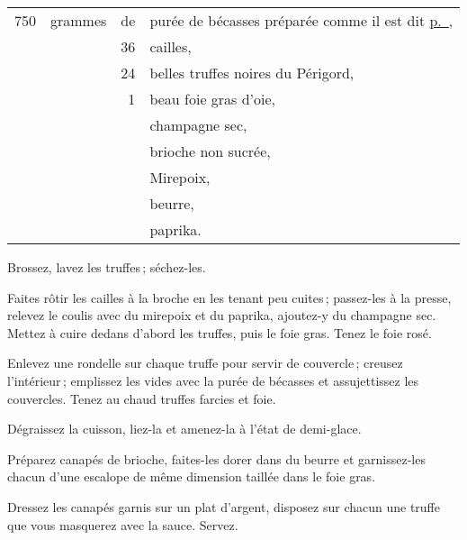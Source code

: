 \footnotesize
\begin{longtable}{rrrp{16em}}
  750 & grammes & de & purée de bécasses préparée comme il est dit \hyperlink{p0634}{p. \pageref{pg0634}}, \\
        &         & 36 & cailles,                                                                          \\
        &         & 24 & belles truffes noires du Périgord,                                                \\
        &         &  1 & beau foie gras d'oie,                                                             \\
        &         &    & champagne sec,                                                                    \\
        &         &    & brioche non sucrée,                                                               \\
        &         &    & Mirepoix,                                                                         \\
        &         &    & beurre,                                                                           \\
        &         &    & paprika.                                                                          \\
\end{longtable}
\normalsize

Brossez, lavez les truffes ; séchez-les.

Faites rôtir les cailles à la broche en les tenant peu cuites ; passez-les à la
presse, relevez le coulis avec du mirepoix et du paprika, ajoutez-y du
champagne sec. Mettez à cuire dedans d'abord les truffes, puis le foie gras.
Tenez le foie rosé.

Enlevez une rondelle sur chaque truffe pour servir de couvercle ; creusez
l'intérieur ; emplissez les vides avec la purée de bécasses et assujettissez
les couvercles. Tenez au chaud truffes farcies et foie.

Dégraissez la cuisson, liez-la et amenez-la à l'état de demi-glace.

Préparez {\mmm} canapés de brioche, faites-les dorer dans du beurre et
garnissez-les chacun d'une escalope de même dimension taillée dans le foie
gras.

Dressez les canapés garnis sur un plat d'argent, disposez sur chacun une truffe
que vous masquerez avec la sauce. Servez.

